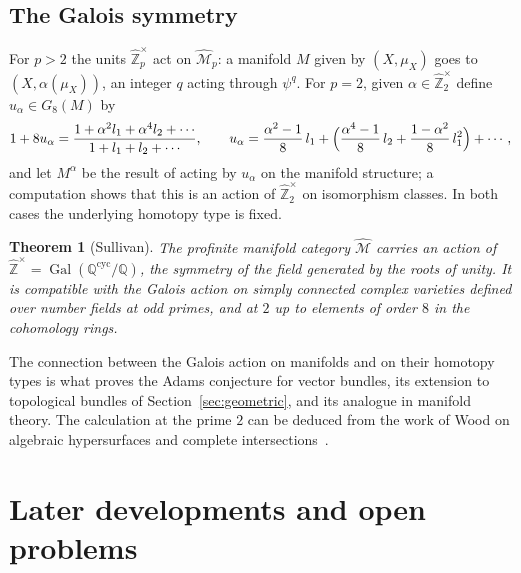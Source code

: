 \documentclass[11pt]{amsart}
\theoremstyle{plain}
\newtheorem{theorem}{Theorem}[section]
\theoremstyle{definition}
\numberwithin{equation}{section}
\newcommand{\Q}{\mathbb{Q}}
\newcommand{\Zhat}{\widehat{\mathbb{Z}}}
\newcommand{\units}{^{\times}}
\DeclareMathOperator{\Gal}{Gal}
\begin{document}
\subsection{The Galois symmetry}
For $p>2$ the units $\Zhat_p\units$ act on $\widehat{\mathcal M}_p$: a manifold $M$ given by $(X,\mu_X)$ goes to $(X,\alpha(\mu_X))$, an integer $q$ acting through $\psi^q$.
For $p=2$, given $\alpha\in\Zhat_2\units$ define $u_\alpha\in G_8(M)$ by
\[
1+8u_\alpha=\frac{1+\alpha^2l_1+\alpha^4l_2+\cdots}{1+l_1+l_2+\cdots},\qquad u_\alpha=\frac{\alpha^2-1}8\,l_1+\Bigl(\frac{\alpha^4-1}8\,l_2+\frac{1-\alpha^2}8\,l_1^2\Bigr)+\cdots,
\]
and let $M^\alpha$ be the result of acting by $u_\alpha$ on the manifold structure; a computation shows that this is an action of $\Zhat_2\units$ on isomorphism classes.
In both cases the underlying homotopy type is fixed.

\begin{theorem}[Sullivan]
The profinite manifold category $\widehat{\mathcal M}$ carries an action of $\Zhat\units=\Gal(\Q^{\mathrm{cyc}}/\Q)$, the symmetry of the field generated by the roots of unity.
It is compatible with the Galois action on simply connected complex varieties defined over number fields at odd primes, and at $2$ up to elements of order $8$ in the cohomology rings.
\end{theorem}

The connection between the Galois action on manifolds and on their homotopy types is what proves the Adams conjecture for vector bundles, its extension to topological bundles of Section~\ref{sec:geometric}, and its analogue in manifold theory.
The calculation at the prime $2$ can be deduced from the work of Wood on algebraic hypersurfaces and complete intersections~\cite{Wood1,Wood2}.

\section{Later developments and open problems}\label{sec:further}
\end{document}
